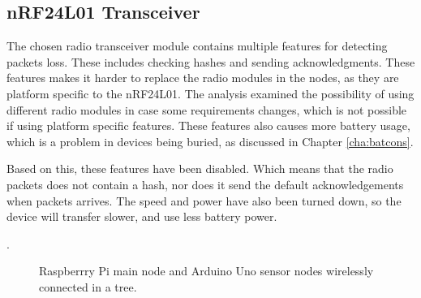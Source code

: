 \subsection{nRF24L01 Transceiver}
The chosen radio transceiver module contains multiple features for detecting packets loss. These includes checking hashes and sending acknowledgments\cite{nf24datasheet}.
These features makes it harder to replace the radio modules in the nodes, as they are platform specific to the nRF24L01. The analysis examined the possibility of using different radio modules in case some requirements changes, which is not possible if using platform specific features. These features also causes more battery usage, which is a problem in devices being buried, as discussed in Chapter \ref{cha:batcons}.

Based on this, these features have been disabled. Which means that the radio packets does not contain a hash, nor does it send the default acknowledgements when packets arrives. The speed and power have also been turned down, so the device will transfer slower, and use less battery power.

.

\begin{figure}[!h]
	\centering
	\caption{Raspberrry Pi main node and Arduino Uno sensor nodes wirelessly connected in a tree.}
	\label{fig:raspbuinoTree}
\end{figure}
